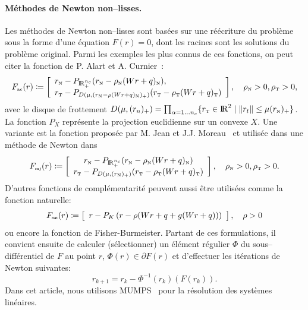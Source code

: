\documentclass{CSMA2017}
\def\RR{\nbR}
\def\nbR{\ensuremath{\mathrm{I\!R}}} %
\def\n{{\hbox{\tiny{N}}}}
\def\t{{\hbox{\tiny{T}}}}
\def\nat{{\hbox{\sf \tiny{nat}}}}
\def\ac{{\hbox{\tiny{ac}}}}
\def\mjtwo{{\hbox{\tiny{mj}}}}
\begin{document}
\paragraph{Méthodes de Newton non--lisses.} 
Les méthodes  de Newton non--lisses sont basées sur une réécriture du problème sous la forme d'une équation $F(r)=0$, dont les racines sont les solutions du problème original. Parmi les exemples les plus connus de ces fonctions, on peut citer la fonction de P. Alart et A. Curnier~\cite{Alart.Curnier1991}:
\begin{equation}
  \label{eq:AC-1}
 F_\ac(r) \coloneqq  
  \left[
  \begin{array}{l} 
    r_\n - P_{\RR^{n_c}_+}(r_\n - \rho_\n  (Wr+q)_\n) , \\
    r_\t - P_{D(\mu, (r_\n - \rho (Wr+q)_\n)_+)}(r_\t - \rho_\t (Wr+q)_\t   )
  \end{array}
  \right],\quad \rho_\n>0, \rho_\t>0,
\end{equation}
avec le disque de frottement  $D(\mu,(r_{n})_+) = \prod_{\alpha=1\ldots n_c} \{ r_\t \in \RR^2 \mid  \|r_t\| \leq \mu (r_\n)_+  \}$. La fonction $P_X$ représente la projection euclidienne sur un convexe $X$. Une variante  est la fonction proposée par M. Jean et J.J. Moreau~\cite{Jean.Moreau1987} et utilisée dans une méthode de Newton dans~\cite{Christensen.Klarbring.ea1998}
\begin{equation}
  \label{eq:MJ-II}
    F_{\mjtwo}(r) \coloneqq \left[ \begin{array}{c}
    r_\n - P_{\RR^{n_c}_+}(r_\n - \rho_\n (W r +  q)_\n) \\
    r_\t - P_{D(\mu, (r_{\n})_+)}(r_\t - \rho_\t (Wr+q)_\t   ) 
  \end{array}\right] ,\quad \rho_\n>0, \rho_\t>0.
\end{equation}
 D'autres fonctions de complémentarité peuvent aussi être utilisées comme la fonction naturelle:
\begin{equation}
  \label{eq:natural-II}
  F_\nat(r) \coloneqq   \left[
  \begin{array}{l} 
    r - P_{K}\left(r  - \rho (Wr+q + g(Wr+q))\right)
  \end{array}\right], \quad \rho >0
\end{equation}
ou encore la fonction de Fisher-Burmeister. Partant de ces formulations, il convient ensuite de calculer (sélectionner) un élément régulier $\Phi$ du sous--différentiel de $F$ au point $r$, $\Phi(r) \in \partial F(r)$ et d'effectuer les itérations de Newton suivantes:
\begin{equation}
  \label{eq:NSN3}
  r_{k+1}  =  r_k -  \Phi^{-1}(r_k) (F(r_k)).
\end{equation}
Dans cet article, nous utilisons MUMPS~\cite{Amestoy.ea_PC2006,Amestoy.ea_SIAMMAA2001} pour la résolution des systèmes linéaires.
\end{document}
